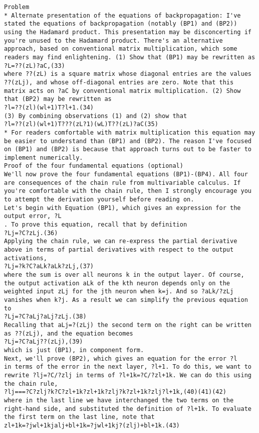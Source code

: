 \begin{lstlisting}
Problem
* Alternate presentation of the equations of backpropagation: I've stated the equations of backpropagation (notably (BP1) and (BP2)) using the Hadamard product. This presentation may be disconcerting if you're unused to the Hadamard product. There's an alternative approach, based on conventional matrix multiplication, which some readers may find enlightening. (1) Show that (BP1) may be rewritten as 
?L=??(zL)?aC,(33)
where ??(zL) is a square matrix whose diagonal entries are the values ??(zLj), and whose off-diagonal entries are zero. Note that this matrix acts on ?aC by conventional matrix multiplication. (2) Show that (BP2) may be rewritten as 
?l=??(zl)(wl+1)T?l+1.(34)
(3) By combining observations (1) and (2) show that 
?l=??(zl)(wl+1)T???(zL?1)(wL)T??(zL)?aC(35)
* For readers comfortable with matrix multiplication this equation may be easier to understand than (BP1) and (BP2). The reason I've focused on (BP1) and (BP2) is because that approach turns out to be faster to implement numerically. 
Proof of the four fundamental equations (optional)
We'll now prove the four fundamental equations (BP1)-(BP4). All four are consequences of the chain rule from multivariable calculus. If you're comfortable with the chain rule, then I strongly encourage you to attempt the derivation yourself before reading on.
Let's begin with Equation (BP1), which gives an expression for the output error, ?L
. To prove this equation, recall that by definition 
?Lj=?C?zLj.(36)
Applying the chain rule, we can re-express the partial derivative above in terms of partial derivatives with respect to the output activations, 
?Lj=?k?C?aLk?aLk?zLj,(37)
where the sum is over all neurons k in the output layer. Of course, the output activation aLk of the kth neuron depends only on the weighted input zLj for the jth neuron when k=j. And so ?aLk/?zLj vanishes when k?j. As a result we can simplify the previous equation to 
?Lj=?C?aLj?aLj?zLj.(38)
Recalling that aLj=?(zLj) the second term on the right can be written as ??(zLj), and the equation becomes 
?Lj=?C?aLj??(zLj),(39)
which is just (BP1), in component form.
Next, we'll prove (BP2), which gives an equation for the error ?l
in terms of the error in the next layer, ?l+1. To do this, we want to rewrite ?lj=?C/?zlj in terms of ?l+1k=?C/?zl+1k. We can do this using the chain rule, 
?lj===?C?zlj?k?C?zl+1k?zl+1k?zlj?k?zl+1k?zlj?l+1k,(40)(41)(42)
where in the last line we have interchanged the two terms on the right-hand side, and substituted the definition of ?l+1k. To evaluate the first term on the last line, note that 
zl+1k=?jwl+1kjalj+bl+1k=?jwl+1kj?(zlj)+bl+1k.(43)

\end{lstlisting}
